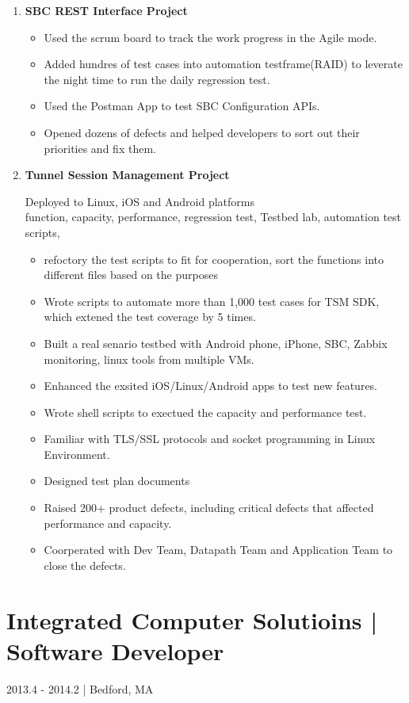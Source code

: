\documentclass[11pt]{article}
\begin{document}
\begin{enumerate}
\item \textbf{SBC REST Interface Project}
\begin{itemize}
    \item Used the scrum board to track the work progress in the Agile mode.
    \item Added hundres of test cases into automation testframe(RAID) to leverate the night time to run the daily regression test.
    \item Used the Postman App to test SBC Configuration APIs.
    \item Opened dozens of defects and helped developers to sort out their priorities and fix them.
\end{itemize}

\item \textbf{Tunnel Session Management Project} 

Deployed to Linux, iOS and Android platforms \\
function, capacity, performance, regression test, Testbed lab, automation test scripts, 

\begin{itemize}
  \item refoctory the test scripts to fit for cooperation, sort the functions into different files based on the purposes
  \item Wrote scripts to automate more than 1,000 test cases for TSM SDK, which extened the test coverage by 5 times.
  \item Built a real senario testbed with Android phone, iPhone, SBC, Zabbix monitoring, linux tools from multiple VMs.
  \item Enhanced the exsited iOS/Linux/Android apps to test new features.
  \item Wrote shell scripts to exectued the capacity and performance test.
  \item Familiar with TLS/SSL protocols and socket programming in Linux Environment.
  \item Designed test plan documents 
  \item Raised 200+ product defects, including critical defects that affected performance and capacity. 
  \item Coorperated with Dev Team, Datapath Team and Application Team to close the defects.

\end{itemize}

\end{enumerate}


\section{Integrated Computer Solutioins | Software Developer}
2013.4 - 2014.2 | Bedford, MA
\end{document}

